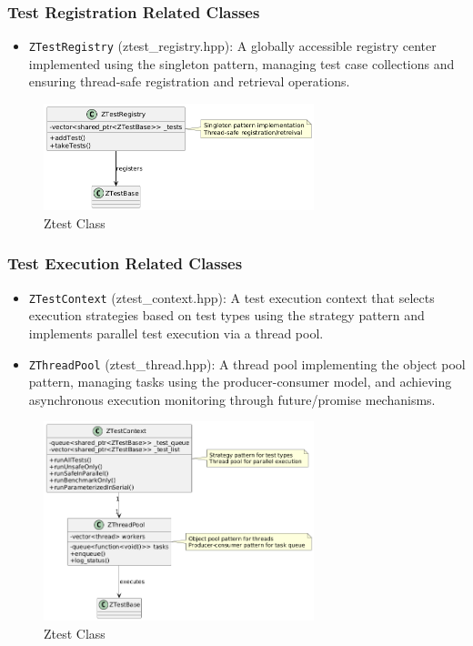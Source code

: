 \documentclass{article}
\begin{document}
\subsubsection{Test Registration Related Classes}
\begin{itemize}
    \item \texttt{ZTestRegistry} (ztest\_registry.hpp): A globally accessible registry center implemented using the singleton pattern, managing test case collections and ensuring thread-safe registration and retrieval operations.
\end{itemize}
\begin{figure}[H]
    \centering
    \includegraphics[width = 0.7\textwidth]{img/c2.png} %
    \caption{ Ztest Class}
    \label{fig:ztest class }
\end{figure}
\subsubsection{Test Execution Related Classes}
\begin{itemize}
    \item \texttt{ZTestContext} (ztest\_context.hpp): A test execution context that selects execution strategies based on test types using the strategy pattern and implements parallel test execution via a thread pool.
    \item \texttt{ZThreadPool} (ztest\_thread.hpp): A thread pool implementing the object pool pattern, managing tasks using the producer-consumer model, and achieving asynchronous execution monitoring through future/promise mechanisms.
\end{itemize}
\begin{figure}[H]
    \centering
    \includegraphics[width = 0.7\textwidth]{img/c3.png} %
    \caption{ Ztest Class}
    \label{fig:ztest class }
\end{figure}
\end{document}
